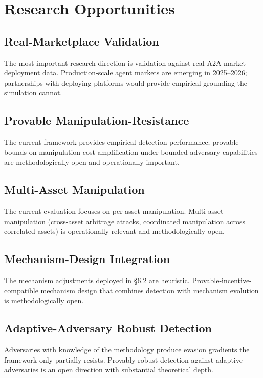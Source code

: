 \documentclass[sigconf,nonacm]{acmart}
\begin{document}
\section{Research Opportunities}

\subsection{Real-Marketplace Validation}

The most important research direction is validation against
real A2A-market deployment data. Production-scale agent markets
are emerging in 2025--2026; partnerships with deploying
platforms would provide empirical grounding the simulation
cannot.

\subsection{Provable Manipulation-Resistance}

The current framework provides empirical detection performance;
provable bounds on manipulation-cost amplification under
bounded-adversary capabilities are methodologically open and
operationally important.

\subsection{Multi-Asset Manipulation}

The current evaluation focuses on per-asset manipulation. Multi-asset
manipulation (cross-asset arbitrage attacks, coordinated
manipulation across correlated assets) is operationally relevant and
methodologically open.

\subsection{Mechanism-Design Integration}

The mechanism adjustments deployed in §6.2 are heuristic.
Provable-incentive-compatible mechanism design that combines
detection with mechanism evolution is methodologically open.

\subsection{Adaptive-Adversary Robust Detection}

Adversaries with knowledge of the methodology produce evasion
gradients the framework only partially resists.
Provably-robust detection against adaptive adversaries is an
open direction with substantial theoretical depth.
\end{document}
